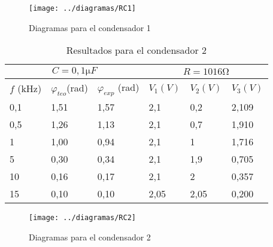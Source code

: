 \documentclass[a4paper,12pt,spanish]{article}
\begin{document}
\begin{figure}[H]
	\centering
	\texttt{[image: ../diagramas/RC1]}
	\caption{Diagramas para el condensador 1}
	\label{fig:montaje}
\end{figure}



\begin{table}[H]
	\centering
	\begin{tabular}{|lll|lll|}
		\hline
		\multicolumn{3}{|c|}{$C= 0,1 \si{\micro F}$}                                                                  & \multicolumn{3}{c|}{$R = 1016 \si{\ohm}$}                                \\ \hline
		\multicolumn{1}{|l|}{$f$ (kHz)} & \multicolumn{1}{l|}{$\varphi_{teo}$(rad)} & $\varphi_{exp}$ (rad) & \multicolumn{1}{l|}{$V_1 (\si{V})$}  & \multicolumn{1}{l|}{$V_2 (\si{V})$}    & $V_3 (\si{V})$ \\ \hline
		\multicolumn{1}{|l|}{0,1}     & \multicolumn{1}{l|}{1,51}                 & 1,57                     & \multicolumn{1}{l|}{2,1}  & \multicolumn{1}{l|}{0,2}  & 2,109       \\ \hline
		\multicolumn{1}{|l|}{0,5}     & \multicolumn{1}{l|}{1,26}                 & 1,13                     & \multicolumn{1}{l|}{2,1}  & \multicolumn{1}{l|}{0,7}  & 1,910       \\ \hline
		\multicolumn{1}{|l|}{1}       & \multicolumn{1}{l|}{1,00}                 & 0,94                     & \multicolumn{1}{l|}{2,1}  & \multicolumn{1}{l|}{1}    & 1,716       \\ \hline
		\multicolumn{1}{|l|}{5}       & \multicolumn{1}{l|}{0,30}                 & 0,34                     & \multicolumn{1}{l|}{2,1}  & \multicolumn{1}{l|}{1,9}  & 0,705       \\ \hline
		\multicolumn{1}{|l|}{10}      & \multicolumn{1}{l|}{0,16}                 & 0,17                     & \multicolumn{1}{l|}{2,1}  & \multicolumn{1}{l|}{2}    & 0,357       \\ \hline
		\multicolumn{1}{|l|}{15}      & \multicolumn{1}{l|}{0,10}                 & 0,10                     & \multicolumn{1}{l|}{2,05} & \multicolumn{1}{l|}{2,05} & 0,200         \\ \hline
	\end{tabular}
	\caption{Resultados para el condensador 2}
	\label{tab:my-table}
\end{table}

\begin{figure}[H]
	\centering
	\texttt{[image: ../diagramas/RC2]}
	\caption{Diagramas para el condensador 2}
	\label{fig:montaje}
\end{figure}
\end{document}
